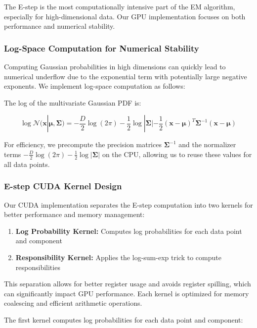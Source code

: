 \documentclass[conference]{IEEEtran}
\begin{document}
The E-step is the most computationally intensive part of the EM algorithm, especially for high-dimensional data. Our GPU implementation focuses on both performance and numerical stability.

\subsubsection{Log-Space Computation for Numerical Stability}

Computing Gaussian probabilities in high dimensions can quickly lead to numerical underflow due to the exponential term with potentially large negative exponents. We implement log-space computation as follows:

The log of the multivariate Gaussian PDF is:

\begin{equation}
\log \mathcal{N}(\mathbf{x}|\boldsymbol{\mu}, \boldsymbol{\Sigma}) = -\frac{D}{2}\log(2\pi) - \frac{1}{2}\log|\boldsymbol{\Sigma}| - \frac{1}{2}(\mathbf{x}-\boldsymbol{\mu})^T \boldsymbol{\Sigma}^{-1} (\mathbf{x}-\boldsymbol{\mu})
\end{equation}

For efficiency, we precompute the precision matrices $\boldsymbol{\Sigma}^{-1}$ and the normalizer terms $-\frac{D}{2}\log(2\pi) - \frac{1}{2}\log|\boldsymbol{\Sigma}|$ on the CPU, allowing us to reuse these values for all data points.

\subsubsection{E-step CUDA Kernel Design}

Our CUDA implementation separates the E-step computation into two kernels for better performance and memory management:

\begin{enumerate}
    \item \textbf{Log Probability Kernel:} Computes log probabilities for each data point and component
    \item \textbf{Responsibility Kernel:} Applies the log-sum-exp trick to compute responsibilities
\end{enumerate}

This separation allows for better register usage and avoids register spilling, which can significantly impact GPU performance. Each kernel is optimized for memory coalescing and efficient arithmetic operations.

The first kernel computes log probabilities for each data point and component:
\end{document}

